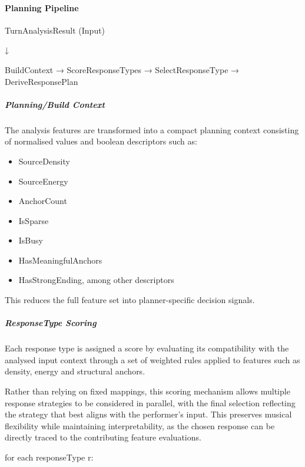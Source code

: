 \paragraph{Planning Pipeline}\label{planning-pipeline}

TurnAnalysisResult (Input)

↓

BuildContext → ScoreResponseTypes → SelectResponseType →
DeriveResponsePlan

\subparagraph{Planning/Build Context}\label{planningbuild-context}

The analysis features are transformed into a compact planning context
consisting of normalised values and boolean descriptors such as:

\begin{itemize}
\item
  SourceDensity
\item
  SourceEnergy
\item
  AnchorCount
\end{itemize}

\begin{itemize}
\item
  IsSparse
\item
  IsBusy
\end{itemize}

\begin{itemize}
\item
  HasMeaningfulAnchors
\item
  HasStrongEnding, among other descriptors
\end{itemize}

This reduces the full feature set into planner-specific decision
signals.

\subparagraph{ResponseType Scoring}\label{responsetype-scoring}

Each response type is assigned a score by evaluating its compatibility
with the analysed input context through a set of weighted rules applied
to features such as density, energy and structural anchors.

Rather than relying on fixed mappings, this scoring mechanism allows
multiple response strategies to be considered in parallel, with the
final selection reflecting the strategy that best aligns with the
performer's input. This preserves musical flexibility while maintaining
interpretability, as the chosen response can be directly traced to the
contributing feature evaluations.

for each responseType r:

